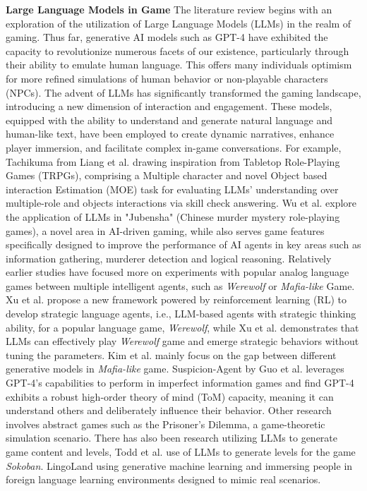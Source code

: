 \textbf{Large Language Models in Game}\quad
The literature review begins with an exploration of the utilization of Large Language Models (LLMs) in the realm of gaming.
Thus far, generative AI models such as GPT-4 have exhibited the capacity to revolutionize numerous facets of our existence, particularly through their ability to emulate human language. This offers many individuals optimism for more refined simulations of human behavior or non-playable characters (NPCs).
The advent of LLMs has significantly transformed the gaming landscape, introducing a new dimension of interaction and engagement. These models, equipped with the ability to understand and generate natural language and human-like text, have been employed to create dynamic narratives, enhance player immersion, and facilitate complex in-game conversations.
For example, Tachikuma from Liang et al.\cite{liang_tachikuma_2023} drawing inspiration from Tabletop Role-Playing Games (TRPGs), comprising a Multiple character and novel Object based interaction Estimation (MOE) task for evaluating LLMs’ understanding over multiple-role and objects interactions via skill check answering.
Wu et al. explore the application of LLMs in "Jubensha" (Chinese murder mystery role-playing games), a novel area in AI-driven gaming, while also serves game features specifically designed to improve the performance of AI agents in key areas such as information gathering, murderer detection and logical reasoning\cite{wu_deciphering_2023}. 
Relatively earlier studies have focused more on experiments with popular analog language games between multiple intelligent agents, such as \textit{Werewolf} or \textit{Mafia-like} Game\cite{xu_language_2023, xu_exploring_2023, kim_generative_2023}.
Xu et al.\cite{xu_language_2023} propose a new framework powered by reinforcement learning (RL) to develop strategic language agents, i.e., LLM-based agents with strategic thinking ability, for a popular language game, \textit{Werewolf}, 
while Xu et al.\cite{xu_exploring_2023} demonstrates that LLMs can effectively play \textit{Werewolf} game and emerge strategic behaviors without tuning the parameters. 
Kim et al.\cite{kim_generative_2023} mainly focus on the gap between different generative models in \textit{Mafia-like} game. 
Suspicion-Agent by Guo et al.\cite{guo_suspicion-agent_2023} leverages GPT-4’s capabilities to perform in imperfect information games and find GPT-4 exhibits a robust high-order theory of mind (ToM) capacity, meaning it can understand others and deliberately influence their behavior. 
Other research involves abstract games such as the Prisoner's Dilemma, a game-theoretic simulation scenario\cite{akata_playing_2023, mao_alympics_2023, lore_strategic_2023}. 
There has also been research utilizing LLMs to generate game content and levels, Todd et al.\cite{todd_level_2023} use of LLMs to generate levels for the game \textit{Sokoban}. 
LingoLand using generative machine learning and immersing people in foreign language learning environments designed to mimic real scenarios\cite{seow_lingoland_2023}.

